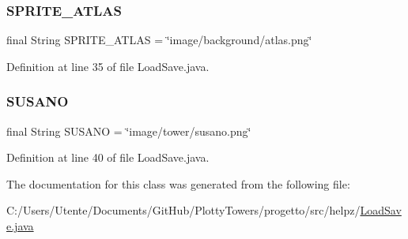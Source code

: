 \subsubsection{\texorpdfstring{S\+P\+R\+I\+T\+E\+\_\+\+A\+T\+L\+AS}{SPRITE\_ATLAS}}
{\footnotesize\ttfamily final String S\+P\+R\+I\+T\+E\+\_\+\+A\+T\+L\+AS = \char`\"{}image/background/atlas.\+png\char`\"{}\hspace{0.3cm}{\ttfamily [static]}}



Definition at line 35 of file Load\+Save.\+java.

\mbox{\label{classhelpz_1_1_load_save_a573e1313d8174920e8909a9e889b9de6}} 
\subsubsection{\texorpdfstring{S\+U\+S\+A\+NO}{SUSANO}}
{\footnotesize\ttfamily final String S\+U\+S\+A\+NO = \char`\"{}image/tower/susano.\+png\char`\"{}\hspace{0.3cm}{\ttfamily [static]}}



Definition at line 40 of file Load\+Save.\+java.



The documentation for this class was generated from the following file\+:\begin{DoxyCompactItemize}
\item 
C\+:/\+Users/\+Utente/\+Documents/\+Git\+Hub/\+Plotty\+Towers/progetto/src/helpz/\hyperlink{_load_save_8java}{Load\+Save.\+java}\end{DoxyCompactItemize}
